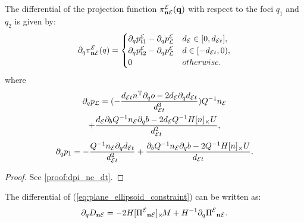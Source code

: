\documentclass[10pt,twocolumn,twoside]{IEEEtran}
\newcommand{\news}{\color{blue}}
\begin{document}
  \begin{proposition}\label{prop:dpi_ne_dt}
    The differential of the projection function $\pi^{\mathcal{E}}_{\mathbf{n} \mathcal{E}}(\mathbf{q})$ with respect to the foci $q_1$ and $q_2$ is given by:
    \begin{equation}
      \partial_q \pi^{\mathcal{E}}_{\mathbf{n} \mathcal{E}}(q) = \begin{cases}
        \partial_q p^{\mathcal{E}}_{t1}-\partial_q p^{\mathcal{E}}_{\mathcal{L}} &  d_{\mathcal{E}} \in [0, d_{\mathcal{E} t}], \\
        \partial_q p^{\mathcal{E}}_{t2}-\partial_q p^{\mathcal{E}}_{\mathcal{L}} &  d \in [- d_{\mathcal{E} t},0), \\
        {0} & otherwise.
      \end{cases}
    \end{equation}
    where
    \begin{multline}
      \partial_q p_{\mathcal{L}} =   (-\frac{d_{\mathcal{E} t} n^\mathrm{T} \partial_q o -2d_{\mathcal{E}} \partial_q d_{\mathcal{E} t}}{d_{\mathcal{E} t}^3} )Q^{-1}n_{\mathcal{E}} \\
      + \frac{d_{\mathcal{E}}\partial_b Q^{-1} n_{\mathcal{E}} \partial_q b -  2d_{\mathcal{E}} Q^{-1}H[n]_\times U}{d_{\mathcal{E} t}^2},
    \end{multline}
    \begin{equation}
      \partial_q p_{1} =  -\frac{Q^{-1}n_{\mathcal{E}} \partial_q d_{\mathcal{E} t} }{d_{\mathcal{E} t}^2} 
      + \frac{\partial_b Q^{-1}n_{\mathcal{E}} \partial_q b -  2Q^{-1}H[n]_\times U }{d_{\mathcal{E} t}}.
    \end{equation}
  \end{proposition}
  \begin{proof}
  See \cref{proof:dpi_ne_dt}.
  \end{proof}
 The differential of (\ref{eq:plane_ellipsoid_constraint}) can be written as:
  \begin{equation}
    \partial_q {D_{\mathbf{n}\mathcal{E}}} = -2 H [{\Pi^{\mathcal{E}}}_{\mathbf{n} \mathcal{E}}]_{\times}\!  M + H^{-1}\partial_q {\Pi^{\mathcal{E}}}_{\mathbf{n} \mathcal{E}}.
  \end{equation}
\end{document}
